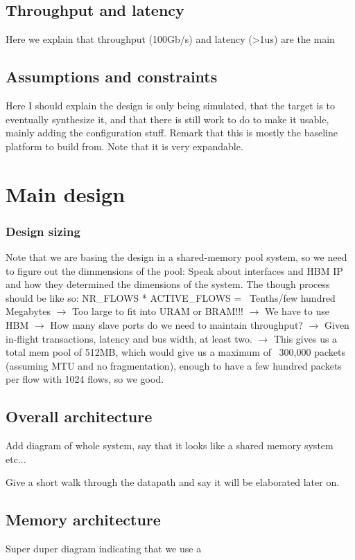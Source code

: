 \subsection{Throughput and latency}
Here we explain that throughput (100Gb/s) and latency (>1us) are the main 

\subsection{Assumptions and constraints}
Here I should explain the design is only being simulated, that the target is to eventually synthesize it,
and that there is still work to do to make it usable, mainly adding the configuration stuff. Remark that
this is mostly the baseline platform to build from. Note that it is very expandable.

\section{Main design}

\subsubsection{Design sizing}
Note that we are basing the design in a shared-memory pool system, so we need to figure out the dimmensions of the pool:
Speak about interfaces and HBM IP and how they determined the dimensions of the system. The though process 
should be like so: NR\_FLOWS * ACTIVE\_FLOWS = ~Tenths/few hundred Megabytes $\rightarrow$ Too large to fit into URAM or BRAM!!!
$\rightarrow$ We have to use HBM $\rightarrow$ How many slave ports do we need to maintain throughput? $\rightarrow$ Given in-flight transactions,
latency and bus width, at least two. $\rightarrow$ This gives us a total mem pool of 512MB, which would give us a maximum of 
~300,000 packets (assuming MTU and no fragmentation), enough to have a few hundred packets per flow with 1024 flows, so we good.

\subsection{Overall architecture}
Add diagram of whole system, say that it looks like a shared memory system etc...

Give a short walk through the datapath and say it will be elaborated later on.

\subsection{Memory architecture}
Super duper diagram indicating that we use a 

